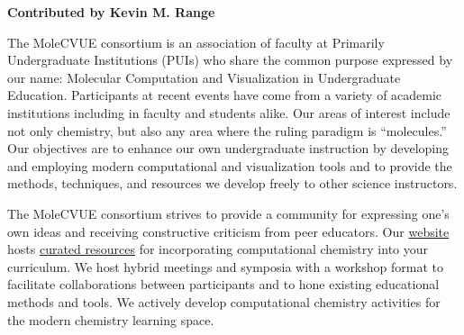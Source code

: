 \textbf{Contributed by Kevin M. Range}

The MoleCVUE consortium is an association of faculty at Primarily Undergraduate Institutions (PUIs) who share the common purpose expressed by our name: Molecular Computation and Visualization in Undergraduate Education. 
Participants at recent events have come from a variety of academic institutions including in faculty and students alike. 
Our areas of interest include not only chemistry, but also any area where the ruling paradigm is “molecules.” 
Our objectives are to enhance our own undergraduate instruction by developing and employing modern computational and visualization tools and to provide the methods, techniques, and resources we develop freely to other science instructors.

The MoleCVUE consortium strives to provide a community for expressing one’s own ideas and receiving constructive criticism from peer educators. Our \href{https://sites.google.com/view/molecvue/events?authuser=0}{website} hosts \href{https://sites.google.com/view/molecvue/resources?authuser=0}{curated resources} for incorporating computational chemistry into your curriculum. We host hybrid meetings and symposia with a workshop format to facilitate collaborations between participants and to hone existing educational methods and tools. We actively develop computational chemistry activities for the modern chemistry learning space.